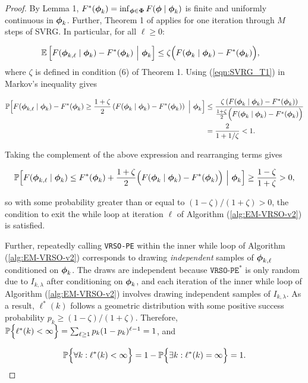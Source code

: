 \begin{proof}

By Lemma 1, $F^*(\boldsymbol{\phi}_k) = \inf_{\boldsymbol{\phi} \in \boldsymbol{\Phi}} F(\boldsymbol{\phi} \mid \boldsymbol{\phi}_k)$ is finite and uniformly continuous in $\boldsymbol{\phi}_k$. Further, Theorem 1 of \citet{Johnson:2013} applies for one iteration through $M$ steps of SVRG. In particular, for all $\ell \geq 0$:

\begin{align}
    \mathbb{E} & \left[F(\boldsymbol{\phi}_{k,\ell} \mid \boldsymbol{\phi}_{k}) - F^*(\boldsymbol{\phi}_k) ~\Big\vert~ \boldsymbol{\phi}_{k} \right] \leq \zeta \Big(F(\boldsymbol{\phi}_{k} \mid \boldsymbol{\phi}_{k}) - F^*(\boldsymbol{\phi}_k) \Big), \label{eqn:SVRG_T1}
\end{align}
%
where $\zeta$ is defined in condition (6) of Theorem 1. Using (\ref{eqn:SVRG_T1}) in Markov's inequality gives

\begin{align}
    \mathbb{P} \Big[F(\boldsymbol{\phi}_{k,\ell} \mid \boldsymbol{\phi}_{k}) - F^*(\boldsymbol{\phi}_{k}) \geq \frac{1 + \zeta}{2} \left(F(\boldsymbol{\phi}_{k} \mid \boldsymbol{\phi}_{k}) - F^*(\boldsymbol{\phi}_k) \right) ~\Big\vert~ \boldsymbol{\phi}_{k} \Big] &\leq \frac{\zeta \left( F(\boldsymbol{\phi}_{k} \mid \boldsymbol{\phi}_{k}) - F^*(\boldsymbol{\phi}_k) \right)}{\frac{1+\zeta}{2} \Big( F(\boldsymbol{\phi}_{k} \mid \boldsymbol{\phi}_{k}) - F^*(\boldsymbol{\phi}_k) \Big)} \\
    &= \frac{2}{1 + 1/\zeta} < 1.
\end{align}

Taking the complement of the above expression and rearranging terms gives

\begin{equation}
    \mathbb{P} \Big[F(\boldsymbol{\phi}_{k,\ell} \mid \boldsymbol{\phi}_{k}) \leq F^*(\boldsymbol{\phi}_{k}) + \frac{1 + \zeta}{2} \Big(F(\boldsymbol{\phi}_{k} \mid \boldsymbol{\phi}_{k}) - F^*(\boldsymbol{\phi}_{k}) \Big) ~\Big\vert~ \boldsymbol{\phi}_{k} \Big] \geq \frac{1-\zeta}{1 + \zeta} > 0 \label{eqn:markov_ineq},
\end{equation}

so with some probability greater than or equal to $(1-\zeta)/(1+\zeta) > 0$, the condition to exit the while loop at iteration $\ell$ of Algorithm (\ref{alg:EM-VRSO-v2}) is satisfied.

Further, repeatedly calling \texttt{VRSO-PE} within the inner while loop of Algorithm (\ref{alg:EM-VRSO-v2}) corresponds to drawing \textit{independent} samples of $\boldsymbol{\phi}_{k,\ell}$ conditioned on $\boldsymbol{\phi}_k$. The draws are independent because $\texttt{VRSO-PE}^*$ is only random due to $I_{k,\lambda}$ after conditioning on $\boldsymbol{\phi}_k$, and each iteration of the inner while loop of Algorithm (\ref{alg:EM-VRSO-v2}) involves drawing independent samples of $I_{k,\lambda}$. As a result, $\ell^*(k)$ follows a geometric distribution with some positive success probability $p_k \geq (1-\zeta)/(1+\zeta)$. Therefore, $\mathbb{P}\Big\{\ell^*(k) < \infty \Big\} = \sum_{\ell \geq 1} p_k(1-p_k)^{\ell-1} = 1$, and 

\begin{equation*}
    \mathbb{P}\Big\{\forall k : \ell^*(k) < \infty \Big\} = 1 - \mathbb{P}\Big\{\exists k : \ell^*(k) = \infty \Big\} = 1.
\end{equation*}
\end{proof}

